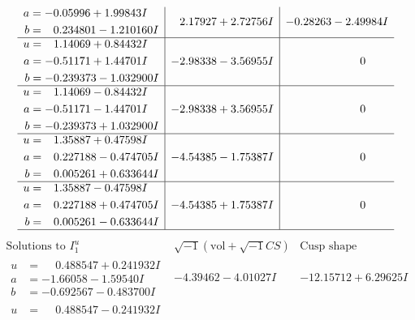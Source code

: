 \documentclass[1p]{elsarticle_modified}
\theoremstyle{definition}
\newcommand{\I}{\sqrt{-1}}
\begin{document}
$$\begin{array}{c|c|c}
\begin{aligned}
a &= -0.05996 + 1.99843 I \\
b &= \phantom{-}0.234801 - 1.210160 I\end{aligned}
 & \phantom{-}2.17927 + 2.72756 I & -0.28263 - 2.49984 I \\ \hline\begin{aligned}
u &= \phantom{-}1.14069 + 0.84432 I \\
a &= -0.51171 + 1.44701 I \\
b &= -0.239373 - 1.032900 I\end{aligned}
 & -2.98338 - 3.56955 I & \phantom{-0.000000 } 0 \\ \hline\begin{aligned}
u &= \phantom{-}1.14069 - 0.84432 I \\
a &= -0.51171 - 1.44701 I \\
b &= -0.239373 + 1.032900 I\end{aligned}
 & -2.98338 + 3.56955 I & \phantom{-0.000000 } 0 \\ \hline\begin{aligned}
u &= \phantom{-}1.35887 + 0.47598 I \\
a &= \phantom{-}0.227188 - 0.474705 I \\
b &= \phantom{-}0.005261 + 0.633644 I\end{aligned}
 & -4.54385 - 1.75387 I & \phantom{-0.000000 } 0 \\ \hline\begin{aligned}
u &= \phantom{-}1.35887 - 0.47598 I \\
a &= \phantom{-}0.227188 + 0.474705 I \\
b &= \phantom{-}0.005261 - 0.633644 I\end{aligned}
 & -4.54385 + 1.75387 I & \phantom{-0.000000 } 0\\
 \hline 
 \end{array}$$\newpage$$\begin{array}{c|c|c}  
\text{Solutions to }I^u_{1}& \I (\text{vol} + \sqrt{-1}CS) & \text{Cusp shape}\\
 \hline 
\begin{aligned}
u &= \phantom{-}0.488547 + 0.241932 I \\
a &= -1.66058 - 1.59540 I \\
b &= -0.692567 - 0.483700 I\end{aligned}
 & -4.39462 - 4.01027 I & -12.15712 + 6.29625 I \\ \hline\begin{aligned}
u &= \phantom{-}0.488547 - 0.241932 I \\

\end{aligned}
\end{array}$$
\end{document}
